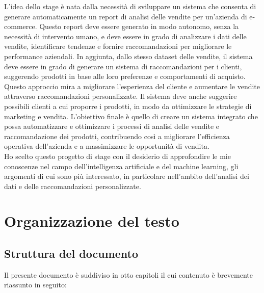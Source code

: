 L'idea dello stage è nata dalla necessità di sviluppare un sistema che consenta di generare automaticamente un report di analisi delle vendite per un'azienda di e-commerce. Questo report deve essere generato in modo autonomo, senza la necessità di intervento umano, e deve essere in grado di analizzare i dati delle vendite, identificare tendenze e fornire raccomandazioni per migliorare le performance aziendali.
In aggiunta, dallo stesso dataset delle vendite, il sistema deve essere in grado di generare un sistema di raccomandazioni per i clienti, suggerendo prodotti in base alle loro preferenze e comportamenti di acquisto. Questo approccio mira a migliorare l'esperienza del cliente e aumentare le vendite attraverso raccomandazioni personalizzate. Il sistema deve anche suggerire possibili clienti a cui proporre i prodotti, in modo da ottimizzare le strategie di marketing e vendita.
L'obiettivo finale è quello di creare un sistema integrato che possa automatizzare e ottimizzare i processi di analisi delle vendite e raccomandazione dei prodotti, contribuendo così a migliorare l'efficienza operativa dell'azienda e a massimizzare le opportunità di vendita.\\
Ho scelto questo progetto di stage con il desiderio di approfondire le mie conoscenze nel campo dell'intelligenza artificiale e del machine learning, gli argomenti di cui sono più interessato, in particolare nell'ambito dell'analisi dei dati e delle raccomandazioni personalizzate.

\section{Organizzazione del testo}

\subsection{Struttura del documento}
\label{sec:organizzazione-testo}
Il presente documento è suddiviso in otto capitoli il cui contenuto è brevemente riassunto in seguito:

